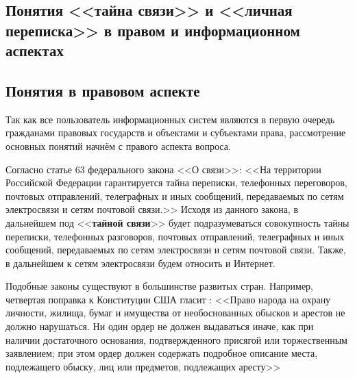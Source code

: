 \parindent=1cm %
\begin{center}
		
		\section{Понятия <<тайна связи>> и <<личная переписка>> в правом и информационном аспектах}
		
\end{center}

\subsection{Понятия в правовом аспекте} 

Так как все пользователь информационных систем являются в первую очередь гражданами правовых государств и объектами и субъектами права, рассмотрение основных понятий начнём с правого аспекта вопроса.

Согласно статье 63 федерального закона <<О связи>>: %
<<На территории Российской Федерации гарантируется тайна переписки, телефонных переговоров, почтовых отправлений, телеграфных и иных сообщений, передаваемых по сетям электросвязи и сетям почтовой связи.>> Исходя из данного закона, в дальнейшем под <<\textbf{тайной связи}>>  будет подразумеваться совокупность тайны переписки, телефонных разговоров, почтовых отправлений, телеграфных и иных сообщений, передаваемых по сетям электросвязи и сетям почтовой связи. Также, в дальнейшем к сетям электросвязи будем относить и Интернет.

Подобные законы существуют в большинстве развитых стран. Например, четвертая поправка  к Конституции США  гласит : <<Право народа на охрану личности, жилища, бумаг и имущества от необоснованных обысков и арестов не должно нарушаться. Ни один ордер не должен выдаваться иначе, как при наличии достаточного основания, подтвержденного присягой или торжественным заявлением; при этом ордер должен содержать подробное описание места, подлежащего обыску, лиц или предметов, подлежащих аресту>> %

